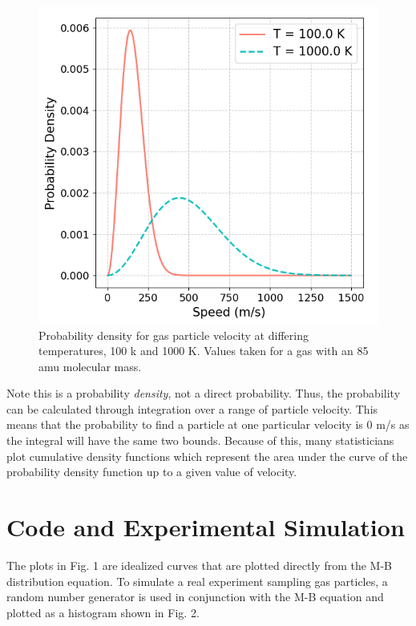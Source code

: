 \documentclass[%
 reprint,
 amsmath,amssymb,
 aps,
]{revtex4-2}
\begin{document}
\begin{figure}[h]
	\caption{Probability density for gas particle velocity at differing temperatures, 100 k and 1000 K. Values taken for a gas with an 85 amu molecular mass. }
	\centering
	\includegraphics[scale=0.51]{hypothesis1.png}
\end{figure}

Note this is a probability \textit{density}, not a direct probability. Thus, the probability can be calculated through integration over a range of particle velocity. This means that the probability to find a particle at one particular velocity is 0 m/s as the integral will have the same two bounds. Because of this, many statisticians plot cumulative density functions which represent the area under the curve of the probability density function up to a given value of velocity.


\section{Code and Experimental Simulation}

The plots in Fig. 1 are idealized curves that are plotted directly from the M-B distribution equation. To simulate a real experiment sampling gas particles, a random number generator is used in conjunction with the M-B equation and plotted as a histogram shown in Fig. 2.
\end{document}
